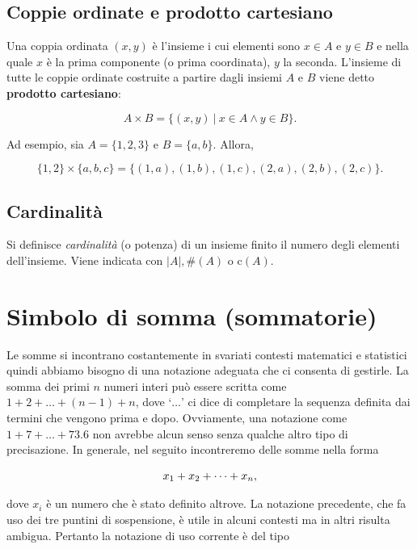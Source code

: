 \documentclass[
  11pt,
]{krantz}
\theoremstyle{definition}
\theoremstyle{definition}
\theoremstyle{definition}
\theoremstyle{definition}
\theoremstyle{remark}
\begin{document}
\hypertarget{coppie-ordinate-e-prodotto-cartesiano}{%
\section{Coppie ordinate e prodotto cartesiano}\label{coppie-ordinate-e-prodotto-cartesiano}}

Una coppia ordinata \((x,y)\) è l'insieme i cui elementi sono \(x \in A\) e \(y \in B\) e nella quale \(x\) è la prima componente (o prima coordinata), \(y\) la seconda. L'insieme di tutte le coppie ordinate costruite a partire dagli insiemi \(A\) e \(B\) viene detto \textbf{prodotto cartesiano}:

\[
A \times B = \{(x, y) ~\vert~ x \in A \land y \in B\}.
\]

Ad esempio, sia \(A = \{1, 2, 3\}\) e \(B = \{a, b\}\). Allora,

\[
\{1, 2\} \times \{a, b, c\} = \{(1, a), (1, b), (1, c), (2, a), (2, b), (2, c)\}.
\]

\hypertarget{cardinalituxe0}{%
\section{Cardinalità}\label{cardinalituxe0}}

Si definisce \emph{cardinalità} (o potenza) di un insieme finito il numero degli elementi dell'insieme. Viene indicata con \(\vert A\vert, \#(A)\) o \(\text{c}(A)\).

\hypertarget{sommatorie}{%
\chapter{Simbolo di somma (sommatorie)}\label{sommatorie}}

Le somme si incontrano costantemente in svariati contesti matematici e statistici quindi abbiamo bisogno di una notazione adeguata che ci consenta di gestirle. La somma dei primi \(n\) numeri interi può essere scritta come \(1+2+\dots+(n-1)+n\), dove `\(\dots\)' ci dice di completare la sequenza definita dai termini che vengono prima e dopo. Ovviamente, una notazione come \(1+7+\dots+73.6\) non avrebbe alcun senso senza qualche altro tipo di precisazione. In generale, nel seguito incontreremo delle somme nella forma

\begin{equation}
x_1+x_2+\dots+x_n,\notag
\end{equation}

dove \(x_i\) è un numero che è stato definito altrove. La notazione precedente, che fa uso dei tre puntini di sospensione, è utile in alcuni contesti ma in altri risulta ambigua. Pertanto la notazione di uso corrente è del tipo
\end{document}
